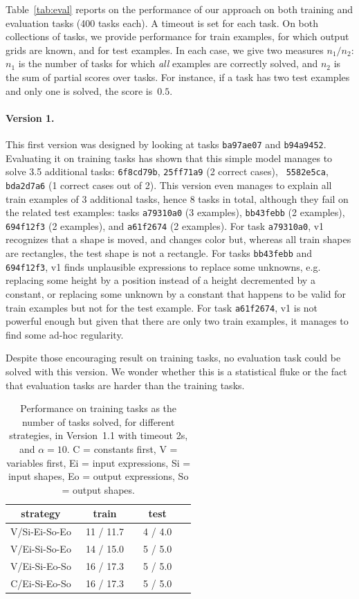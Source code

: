 \documentclass[a4paper]{llncs}
\begin{document}
Table~\ref{tab:eval} reports on the performance of our approach on
both training and evaluation tasks (400 tasks each). A timeout is set
for each task. On both collections of tasks, we provide performance
for train examples, for which output grids are known, and for test
examples. In each case, we give two measures $n_1/n_2$: $n_1$ is the
number of tasks for which {\em all} examples are correctly solved, and
$n_2$ is the sum of partial scores over tasks. For instance, if a task
has two test examples and only one is solved, the score is~$0.5$.

\paragraph{Version 1.} This first version was designed by looking at
tasks {\tt ba97ae07} and {\tt b94a9452}. Evaluating it on training
tasks has shown that this simple model manages to solve 3.5 additional
tasks: {\tt 6f8cd79b}, {\tt 25ff71a9} (2 correct cases), {\tt
  5582e5ca}, {\tt bda2d7a6} (1 correct cases out of 2). This version
even manages to explain all train examples of 3 additional tasks,
hence 8 tasks in total, although they fail on the related test
examples: tasks {\tt a79310a0} (3 examples), {\tt bb43febb} (2
examples), {\tt 694f12f3} (2 examples), and {\tt a61f2674} (2
examples). For task {\tt a79310a0}, v1 recognizes that a shape is
moved, and changes color but, whereas all train shapes are rectangles,
the test shape is not a rectangle. For tasks {\tt bb43febb} and {\tt
  694f12f3}, v1 finds unplausible expressions to replace some
unknowns, e.g. replacing some height by a position instead of a height
decremented by a constant, or replacing some unknown by a constant
that happens to be valid for train examples but not for the test
example. For task {\tt a61f2674}, v1 is not powerful enough but given
that there are only two train examples, it manages to find some ad-hoc
regularity.

Despite those encouraging result on training tasks, no evaluation task
could be solved with this version. We wonder whether this is a
statistical fluke or the fact that evaluation tasks are harder than
the training tasks.

\begin{table}[t]
  \centering
  \caption{Performance on training tasks as the number of tasks solved, for different strategies, in Version~1.1 with timeout 2s, and $\alpha=10$. C = constants first, V = variables first, Ei = input expressions, Si = input shapes, Eo = output expressions, So = output shapes.}
  \begin{tabular}{|c|c|c|c|}
    \hline
    strategy & train & test \\
    \hline
    V/Si-Ei-So-Eo & ~11 / 11.7~ & ~4 / 4.0~ \\
    V/Ei-Si-So-Eo & ~14 / 15.0~ & ~5 / 5.0~ \\
    V/Ei-Si-Eo-So & ~16 / 17.3~ & ~5 / 5.0~ \\
    C/Ei-Si-Eo-So & ~16 / 17.3~ & ~5 / 5.0~ \\
    \hline
  \end{tabular}
  \label{tab:v11:strategies}
\end{table}
\end{document}
